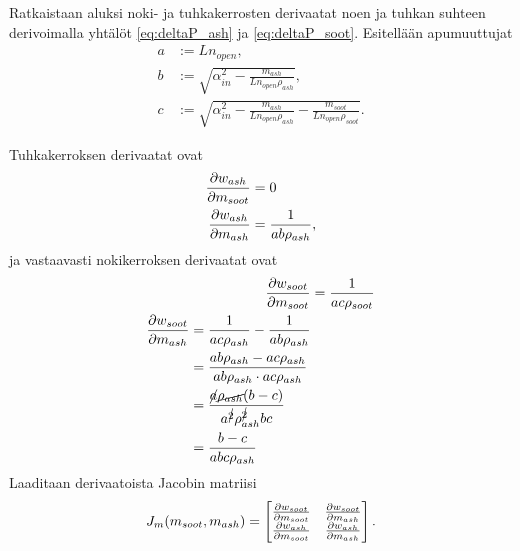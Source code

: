 
Ratkaistaan aluksi noki- ja tuhkakerrosten derivaatat noen ja tuhkan suhteen derivoimalla yhtälöt \eqref{eq:deltaP_ash} ja \eqref{eq:deltaP_soot}.
Esitellään apumuuttujat
\begin{align*}
    a &:= L n_{open}, \\
    b &:= \sqrt{\alpha_{in}^2 - \frac{m_{ash}}{L n_{open} \rho_{ash}}}, \\
    c &:= \sqrt{\alpha_{in}^2 - \frac{m_{ash}}{L n_{open} \rho_{ash}} - \frac{m_{soot}}{L n_{open} \rho_{soot}}}.
\end{align*}

Tuhkakerroksen derivaatat ovat
\begin{align}
    \frac{\partial w_{ash}}{\partial m_{soot}} & =0\\
    \frac{\partial w_{ash}}{\partial m_{ash}} &= \frac{1}{ab\rho_{ash}},
\end{align}
ja vastaavasti nokikerroksen derivaatat ovat
\begin{align}
    \frac{\partial w_{soot}}{\partial m_{soot}} &= \frac{1}{ac\rho_{soot}}\\
    \begin{split}
    \frac{\partial w_{soot}}{\partial m_{ash}} &= \frac{1}{ac\rho_{ash}}-\frac{1}{ab\rho_{ash}}
    \\ &= \frac{ab \rho_{ash} - ac\rho_{ash}}{ab\rho_{ash}\cdot ac \rho_{ash}}
    \\ &= \frac{\cancel{a}\cancel{\rho_{ash}}(b-c)}{a^{\cancel{2}} \rho_{ash}^{\cancel{2}} bc}
    \\ &= \frac{b-c}{abc\rho_{ash}}
    \end{split}
\end{align}
Laaditaan derivaatoista Jacobin matriisi
\begin{align}
    J_m(m_{soot}, m_{ash}) = 
    \begin{bmatrix} 
        \frac{\partial w_{soot}}{\partial m_{soot}} & \frac{\partial w_{soot}}{\partial m_{ash}}
    \\  \frac{\partial w_{ash}}{\partial m_{soot}} & \frac{\partial w_{ash}}{\partial m_{ash}}
     \end{bmatrix}.
\end{align}

